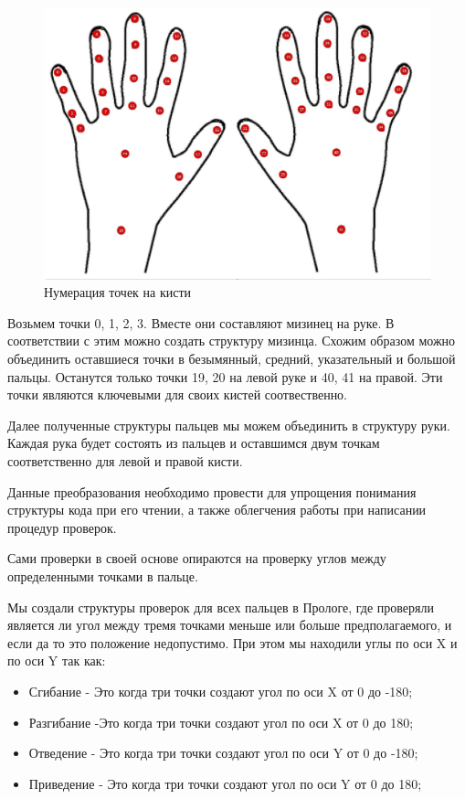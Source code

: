 \begin{figure}[ht!]
	\centering
	\includegraphics[scale=0.5]{Kist.jpg}
	\caption{Нумерация точек на кисти}
	\label{fig:hands}
\end{figure}

\hspace{0.6cm} Возьмем точки 0, 1, 2, 3. Вместе они составляют мизинец на руке. В соответствии с этим можно создать структуру мизинца. Схожим образом можно объединить оставшиеся точки в безымянный, средний, указательный и большой пальцы. Останутся только точки 19, 20 на левой руке и 40, 41 на правой. Эти точки являются ключевыми для своих кистей соотвественно.

\hspace{0.6cm} Далее полученные структуры пальцев мы можем объединить в структуру руки. Каждая рука будет состоять из пальцев и оставшимся двум точкам соответственно для левой и правой кисти.

\hspace{0.6cm} Данные преобразования необходимо провести для упрощения понимания структуры кода при его чтении, а также облегчения работы при написании процедур проверок.

\hspace{0.6cm} Сами проверки в своей основе опираются на проверку углов между определенными точками в пальце.  

\hspace{0.6cm} Мы создали структуры проверок для всех пальцев в Прологе, где проверяли является ли угол между тремя точками меньше или больше предполагаемого, и если да то это положение недопустимо. При этом мы находили углы по оси X и по оси Y так как:
\begin{itemize}
	\item Сгибание - Это когда три точки создают угол по оси X от 0 до -180;
	\item Разгибание -Это когда три точки создают угол по оси X от 0 до 180;
	\item Отведение - Это когда три точки создают угол по оси Y от 0 до -180;
	\item Приведение - Это когда три точки создают угол по оси Y от 0 до 180;
\end{itemize}

